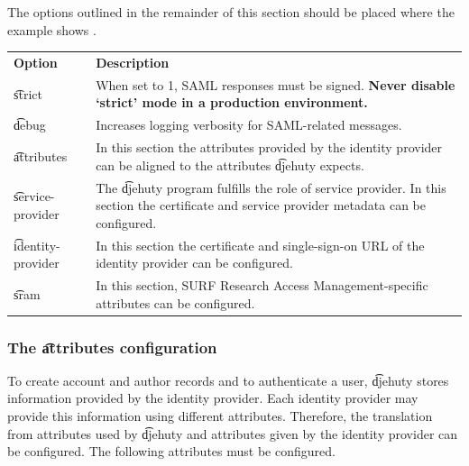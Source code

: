   The options outlined in the remainder of this section should be placed
  where the example shows .

\begin{tabularx}{\textwidth}{*{1}{!{\VRule[-1pt]}l}!{\VRule[-1pt]}X}
  \headrow
  \textbf{Option}             & \textbf{Description}\\
  \t{strict}                  & When set to 1, SAML responses must be signed.
                                \textbf{Never disable `strict' mode in a
                                production environment.}\\
  \t{debug}                   & Increases logging verbosity for SAML-related messages.\\
  \t{attributes}              & In this section the attributes provided by the
                                identity provider can be aligned to the
                                attributes \t{djehuty} expects.\\
  \t{service-provider}        & The \t{djehuty} program fulfills the role of
                                service provider.  In this section the
                                certificate and service provider metadata
                                can be configured.\\
  \t{identity-provider}       & In this section the certificate and
                                single-sign-on URL of the identity provider
                                can be configured.\\
  \t{sram}                    & In this section, SURF Research Access
                                Management-specific attributes can be
                                configured.
\end{tabularx}

\subsubsection{The \t{attributes} configuration}

  To create account and author records and to authenticate a user, \t{djehuty}
  stores information provided by the identity provider.  Each identity provider
  may provide this information using different attributes.  Therefore, the
  translation from attributes used by \t{djehuty} and attributes given by the
  identity provider can be configured.  The following attributes must be
  configured.

